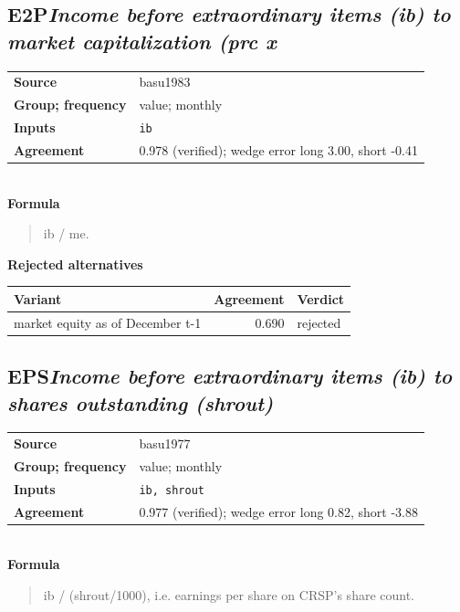 \documentclass[11pt]{article}
\begin{document}
\subsection*{E2P\quad\normalfont\itshape Income before extraordinary items (ib) to market capitalization (prc x}
\begin{tabular}{@{}p{3.3cm}p{12.3cm}@{}}
\textbf{Source} & basu1983\\
\textbf{Group; frequency} & value; monthly\\
\textbf{Inputs} & \texttt{ib}\\
\textbf{Agreement} & 0.978 (verified); wedge error long 3.00, short -0.41\\
\end{tabular}\\[4pt]
\textbf{Formula}
\begin{quote}\small
ib / me.\\

\end{quote}
\textbf{Rejected alternatives}\\[2pt]
{\small\begin{longtable}{@{}p{9.6cm}rp{4.3cm}@{}}
\toprule Variant & Agreement & Verdict\\\midrule\endhead
market equity as of December t-1 & 0.690 & rejected\\
\bottomrule\end{longtable}}
\subsection*{EPS\quad\normalfont\itshape Income before extraordinary items (ib) to shares outstanding (shrout)}
\begin{tabular}{@{}p{3.3cm}p{12.3cm}@{}}
\textbf{Source} & basu1977\\
\textbf{Group; frequency} & value; monthly\\
\textbf{Inputs} & \texttt{ib, shrout}\\
\textbf{Agreement} & 0.977 (verified); wedge error long 0.82, short -3.88\\
\end{tabular}\\[4pt]
\textbf{Formula}
\begin{quote}\small
ib / (shrout/1000), i.e. earnings per share on CRSP's share count.\\

\end{quote}
\end{document}
